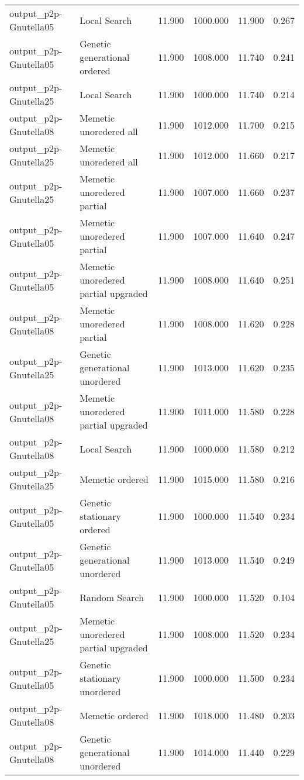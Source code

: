 \documentclass{article}
\begin{document}
\begin{table}[htbp]
{\begin{tabular}{ l l r r r r }
    output\_p2p-Gnutella05 & Local Search & 11.900 & 1000.000 & 11.900 & 0.267 \\
    output\_p2p-Gnutella05 & Genetic generational ordered & 11.900 & 1008.000 & 11.740 & 0.241 \\
    output\_p2p-Gnutella25 & Local Search & 11.900 & 1000.000 & 11.740 & 0.214 \\
    output\_p2p-Gnutella08 & Memetic unoredered all & 11.900 & 1012.000 & 11.700 & 0.215 \\
    output\_p2p-Gnutella25 & Memetic unoredered all & 11.900 & 1012.000 & 11.660 & 0.217 \\
    output\_p2p-Gnutella25 & Memetic unoredered partial & 11.900 & 1007.000 & 11.660 & 0.237 \\
    output\_p2p-Gnutella05 & Memetic unoredered partial & 11.900 & 1007.000 & 11.640 & 0.247 \\
    output\_p2p-Gnutella05 & Memetic unoredered partial upgraded & 11.900 & 1008.000 & 11.640 & 0.251 \\
    output\_p2p-Gnutella08 & Memetic unoredered partial & 11.900 & 1008.000 & 11.620 & 0.228 \\
    output\_p2p-Gnutella25 & Genetic generational unordered & 11.900 & 1013.000 & 11.620 & 0.235 \\
    output\_p2p-Gnutella08 & Memetic unoredered partial upgraded & 11.900 & 1011.000 & 11.580 & 0.228 \\
    output\_p2p-Gnutella08 & Local Search & 11.900 & 1000.000 & 11.580 & 0.212 \\
    output\_p2p-Gnutella25 & Memetic ordered & 11.900 & 1015.000 & 11.580 & 0.216 \\
    output\_p2p-Gnutella05 & Genetic stationary ordered & 11.900 & 1000.000 & 11.540 & 0.234 \\
    output\_p2p-Gnutella05 & Genetic generational unordered & 11.900 & 1013.000 & 11.540 & 0.249 \\
    output\_p2p-Gnutella05 & Random Search & 11.900 & 1000.000 & 11.520 & 0.104 \\
    output\_p2p-Gnutella25 & Memetic unoredered partial upgraded & 11.900 & 1008.000 & 11.520 & 0.234 \\
    output\_p2p-Gnutella05 & Genetic stationary unordered & 11.900 & 1000.000 & 11.500 & 0.234 \\
    output\_p2p-Gnutella08 & Memetic ordered & 11.900 & 1018.000 & 11.480 & 0.203 \\
    output\_p2p-Gnutella08 & Genetic generational unordered & 11.900 & 1014.000 & 11.440 & 0.229 \\

\end{tabular}}
\end{table}
\end{document}
